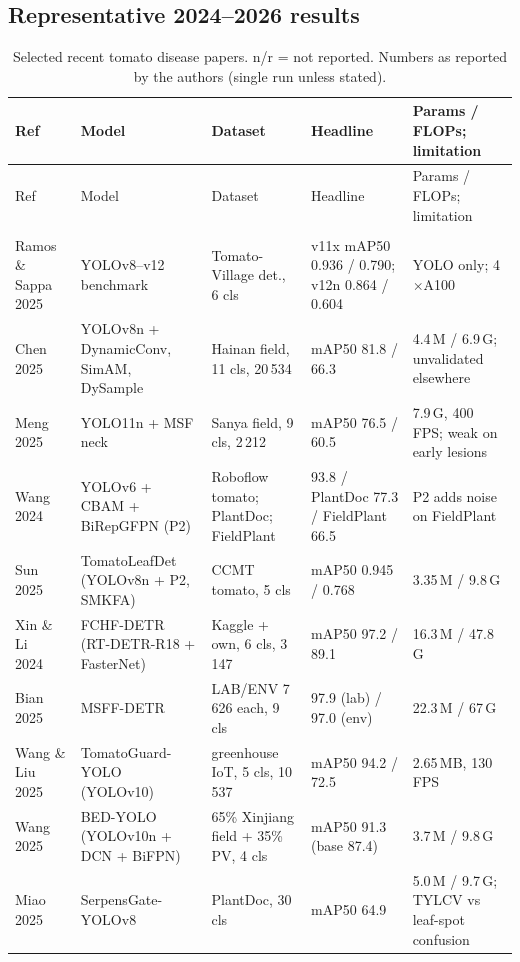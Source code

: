 \subsection{Representative 2024--2026 results}
\begin{longtable}{@{}L{2.9cm}L{3.3cm}L{3.6cm}L{3.2cm}L{3.0cm}@{}}
\caption{Selected recent tomato disease papers. n/r = not reported. Numbers as reported by the authors (single run unless stated).}\label{tab:sota}\\
\toprule
Ref & Model & Dataset & Headline & Params / FLOPs; limitation \\
\midrule
\endfirsthead
\toprule
Ref & Model & Dataset & Headline & Params / FLOPs; limitation \\
\midrule
\endhead
\bottomrule
\endfoot
{}\\
Ramos \& Sappa 2025~\cite{ramos2025} & YOLOv8--v12 benchmark & Tomato-Village det., 6 cls & v11x mAP50 0.936 / 0.790; v12n 0.864 / 0.604 & YOLO only; 4$\times$A100 \\
Chen 2025~\cite{chen2025yolov8n} & YOLOv8n + DynamicConv, SimAM, DySample & Hainan field, 11 cls, 20\,534 & mAP50 81.8 / 66.3 & 4.4\,M / 6.9\,G; unvalidated elsewhere \\
Meng 2025~\cite{meng2025} & YOLO11n + MSF neck & Sanya field, 9 cls, 2\,212 & mAP50 76.5 / 60.5 & 7.9\,G, 400 FPS; weak on early lesions \\
Wang 2024~\cite{wang2024v6} & YOLOv6 + CBAM + BiRepGFPN (P2) & Roboflow tomato; PlantDoc; FieldPlant & 93.8 / PlantDoc 77.3 / FieldPlant 66.5 & P2 adds noise on FieldPlant \\
Sun 2025~\cite{tomatoleafdet} & TomatoLeafDet (YOLOv8n + P2, SMKFA) & CCMT tomato, 5 cls & mAP50 0.945 / 0.768 & 3.35\,M / 9.8\,G \\
Xin \& Li 2024~\cite{fchfdetr} & FCHF-DETR (RT-DETR-R18 + FasterNet) & Kaggle + own, 6 cls, 3\,147 & mAP50 97.2 / 89.1 & 16.3\,M / 47.8\,G \\
Bian 2025~\cite{msffdetr} & MSFF-DETR & LAB/ENV 7\,626 each, 9 cls & 97.9 (lab) / 97.0 (env) & 22.3\,M / 67\,G \\
Wang \& Liu 2025~\cite{tomatoguard} & TomatoGuard-YOLO (YOLOv10) & greenhouse IoT, 5 cls, 10\,537 & mAP50 94.2 / 72.5 & 2.65\,MB, 130 FPS \\
Wang 2025~\cite{bedyolo} & BED-YOLO (YOLOv10n + DCN + BiFPN) & 65\% Xinjiang field + 35\% PV, 4 cls & mAP50 91.3 (base 87.4) & 3.7\,M / 9.8\,G \\
Miao 2025~\cite{serpensgate} & SerpensGate-YOLOv8 & PlantDoc, 30 cls & mAP50 64.9 & 5.0\,M / 9.7\,G; TYLCV vs leaf-spot confusion \\

\end{longtable}
